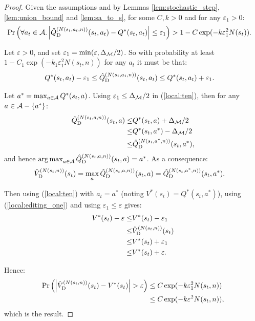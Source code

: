     \begin{proof}
        Given the assumptions and by Lemmas \ref{lem:stochastic_step}, \ref{lem:union_bound} and \ref{lem:sa_to_s}, for some $C,k>0$ and for any $\varepsilon_1>0$:
        \begin{align}
            \Pr\left(\forall a_t\in\mathcal{A}. \left|{\hat{Q}^{(N(s_t,a_t,n))}_{{\textnormal{D}}}}(s_t,a_t)-Q^*(s_t,a_t)\right|
                \leq \varepsilon_1\right) &> 1-C \exp(-k \varepsilon_1^2 N(s_t)).
        \end{align}
        
        Let $\varepsilon >0$, and set $\varepsilon_1 = \min(\varepsilon,\Delta_{\mathcal{M}}/2)$. So with probability at least $1-C_1 \exp(-k_1 \varepsilon_1^2 N(s_t,n))$ for any $a_t$ it must be that:
        \begin{align}
            Q^*(s_t,a_t) - \varepsilon_1 \leq {\hat{Q}^{(N(s_t,a_t,n))}_{{\textnormal{D}}}}(s_t,a_t) &\leq Q^*(s_t,a_t) + \varepsilon_1. 
                \label{local:ten}
        \end{align}
        
        Let $a^*=\max_{a\in\mathcal{A}} Q^*(s_t,a)$. Using $\varepsilon_1 \leq \Delta_{\mathcal{M}}/2$ in (\ref{local:ten}), then for any $a\in\mathcal{A}-\{ a^*\}$:
        \begin{align}
            {\hat{Q}^{(N(s_t,a,n))}_{{\textnormal{D}}}}(s_t,a) \leq& Q^*(s_t,a) + \Delta_{\mathcal{M}}/2 \\
                \leq& Q^*(s_t,a^*) - \Delta_{\mathcal{M}}/2 \\
                \leq& {\hat{Q}^{(N(s_t,a^*,n))}_{{\textnormal{D}}}}(s_t,a^*),
        \end{align}
        and hence $\operatorname*{arg\,max}_{a\in\mathcal{A}} {\hat{Q}^{(N(s_t,a,n))}_{{\textnormal{D}}}}(s_t,a) = a^*$. As a consequence:
        \begin{align}
            {\hat{V}^{(N(s_t,n))}_{{\textnormal{D}}}}(s_t) &= \max_a {\hat{Q}^{(N(s_t,a,n))}_{{\textnormal{D}}}}(s_t,a) = {\hat{Q}^{(N(s_t,a^*,n))}_{{\textnormal{D}}}}(s_t,a^*). 
                \label{local:editing_one}
        \end{align}
        
        Then using (\ref{local:ten}) with $a_t=a^*$ (noting $V^*(s_t)=Q^*(s_t,a^*)$), using (\ref{local:editing_one}) and using $\varepsilon_1 \leq \varepsilon$ gives:
        \begin{align}
            V^*(s_t) - \varepsilon
                \leq& V^*(s_t) - \varepsilon_1 \\
                \leq& {\hat{V}^{(N(s_t,n))}_{{\textnormal{D}}}}(s_t) \\
                \leq& V^*(s_t) + \varepsilon_1 \\
                \leq& V^*(s_t) + \varepsilon. 
        \end{align}
        
        Hence:
        \begin{align}
            \Pr\left(\left|{\hat{V}^{(N(s_t,n))}_{{\textnormal{D}}}}(s_t)-V^*(s_t)\right| > \varepsilon\right) 
                &\leq C \exp(-k \varepsilon_1^2 N(s_t,n)) \\
                &\leq C \exp(-k \varepsilon^2 N(s_t,n)),
        \end{align}
        which is the result.
    \end{proof}
